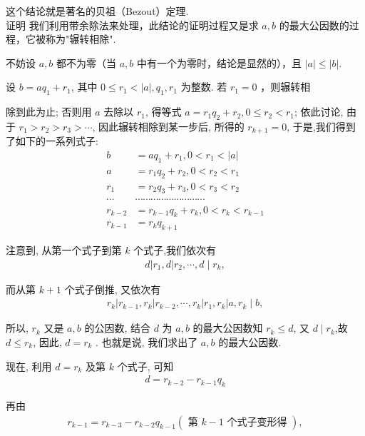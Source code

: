 这个结论就是著名的贝祖（Bezout）定理. \\
证明 我们利用带余除法来处理，此结论的证明过程又是求 $a ,  b$ 的最大公因数的过程，它被称为"辗转相除". 

不妨设 $a ,  b$ 都不为零（当 $a ,  b$ 中有一个为零时，结论是显然的），且 $|a| \leqslant|b|$.

设 $b=a q_{1}+r_{1}$, 其中 $0 \leqslant r_{1}<|a|, q_{1} ,  r_{1}$ 为整数. 若 $r_{1}=0$ ，则辗转相

除到此为止; 否则用 $a$ 去除以 $r_{1}$, 得等式 $a=r_{1} q_{2}+r_{2}, 0 \leqslant r_{2}<r_{1}$; 依此讨论, 由于 $r_{1}>r_{2}>r_{3}>\cdots$, 因此辗转相除到某一步后, 所得的 $r_{k+1}=0$, 于是,我们得到了如下的一系列式子:\\
\begin{align}
b & =a q_{1}+r_{1}, 0<r_{1}<|a| \\
a & =r_{1} q_{2}+r_{2}, 0<r_{2}<r_{1} \\
r_{1} & =r_{2} q_{3}+r_{3}, 0<r_{3}<r_{2} \\
\cdots & \cdots \cdots \cdots \cdots \cdots \cdots \cdots \cdots \cdots \\
r_{k-2} & =r_{k-1} q_{k}+r_{k}, 0<r_{k}<r_{k-1} \\
r_{k-1} & =r_{k} q_{k+1}
\end{align}

注意到, 从第一个式子到第 $k$ 个式子,我们依次有\\
\begin{align*}
d\left|r_{1}, d\right| r_{2}, \cdots, d \mid r_{k},
\end{align*}

而从第 $k+1$ 个式子倒推, 又依次有\\
\begin{align*}
r_{k}\left|r_{k-1}, r_{k}\right| r_{k-2}, \cdots, r_{k}\left|r_{1}, r_{k}\right| a, r_{k} \mid b,
\end{align*}

所以, $r_{k}$ 又是 $a ,  b$ 的公因数, 结合 $d$ 为 $a ,  b$ 的最大公因数知 $r_{k} \leqslant d$, 又 $d \mid r_{k}$,故 $d \leqslant r_{k}$, 因此, $d=r_{k}$ . 也就是说, 我们求出了 $a ,  b$ 的最大公因数.

现在, 利用 $d=r_{k}$ 及第 $k$ 个式子, 可知\\
\begin{align*}
d=r_{k-2}-r_{k-1} q_{k}
\end{align*}

再由\\
\begin{align*}
r_{k-1}=r_{k-3}-r_{k-2} q_{k-1}(\text { 第 } k-1 \text { 个式子变形得 }),
\end{align*}

